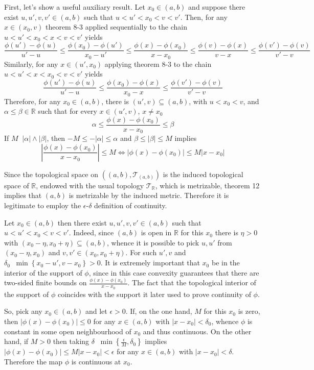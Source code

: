 \documentclass[a4paper]{article}
\newcommand{\obj}[1]{\left\{ #1 \right \}}
\newcommand{\brac}[1]{\left ( #1 \right )}
\newcommand{\abs}[1]{\left | #1 \right |}
\newcommand{\Real}{\mathbb{R}}
\newcommand{\Tcal}{\mathcal{T}}
\newcommand{\defn}{\mathop{\overset{\Delta}{=}}\nolimits}
\begin{document}
First, let's show a useful auxiliary result. Let $x_0\in \brac{a,b}$ and suppose there exist $u, u', v, v' \in \brac{a,b}$ such that $u < u' < x_0 < v < v'$. Then, for any $x\in \brac{x_0, v}$ theorem 8-3 applied sequentially to the chain $u<u'< x_0 < x < v < v'$ yields \[\frac{\phi\brac{u'} - \phi\brac{u}}{u'-u} \leq \frac{\phi\brac{x_0} - \phi\brac{u'}}{x_0-u'} \leq \frac{\phi\brac{x} - \phi\brac{x_0}}{x-x_0} \leq \frac{\phi\brac{v} - \phi\brac{x}}{v-x} \leq \frac{\phi\brac{v'} - \phi\brac{v}}{v'-v}\] Similarly, for any $x\in \brac{u', x_0}$ applying theorem 8-3 to the chain $u<u'<x<x_0<v<v'$ yields \[\frac{\phi\brac{u'} - \phi\brac{u}}{u'-u} \leq \frac{\phi\brac{x_0} - \phi\brac{x}}{x_0-x} \leq \frac{\phi\brac{v'} - \phi\brac{v}}{v'-v}\] Therefore, for any $x_0\in \brac{a, b}$, there is $\brac{u',v}\subseteq \brac{a,b}$, with $u<x_0<v$, and $\alpha\leq \beta \in \Real$ such that for every $x\in \brac{u',v}$, $x\neq x_0$ \[\alpha \leq \frac{\phi\brac{x} - \phi\brac{x_0}}{x-x_0} \leq \beta\] If $M\defn \abs{\alpha}\wedge\abs{\beta}$, then $-M \leq -\abs{\alpha}\leq \alpha$ and $\beta\leq \abs{\beta} \leq M$ implies \[\abs{\frac{\phi\brac{x} - \phi\brac{x_0}}{x-x_0}} \leq M \Leftrightarrow \abs{\phi\brac{x} - \phi\brac{x_0}}\leq M \abs{x-x_0} \]

Since the topological space on $\brac{\brac{a,b}, \Tcal_{\brac{a,b}} }$ is the induced topological space of $\Real$, endowed with the usual topology $\Tcal_\Real$, which is metrizable, theorem 12 implies that $\brac{a,b}$ is metrizable by the induced metric. Therefore it is legitimate to employ the $\epsilon$-$\delta$ definition of continuity.

Let $x_0\in \brac{a,b}$ then there exist $u, u', v, v' \in \brac{a,b}$ such that $u < u' < x_0 < v < v'$. Indeed, since $\brac{a,b}$ is open in $\Real$ for this $x_0$ there is $\eta>0$ with $\brac{ x_0-\eta, x_0+\eta }\subseteq \brac{a, b}$, whence it is possible to pick $u,u'$ from $\brac{x_0-\eta, x_0}$ and $v,v'\in\brac{x_0, x_0+\eta}$. For such $u', v$ and $\delta_0 \defn \min\obj{ x_0 - u', v - x_0} > 0$. It is extremely important that $x_0$ be in the interior of the support of $\phi$, since in this case convexity guarantees that there are two-sided finite bounds on $\frac{\phi\brac{x}-\phi\brac{x_0}}{x-x_0}$. The fact that the topological interior of the support of $\phi$ coincides with the support it later used to prove continuity of $\phi$.

So, pick any $x_0\in \brac{a, b}$ and let $\epsilon>0$. If, on the one hand, $M$ for this $x_0$ is zero, then $\abs{\phi\brac{x}-\phi\brac{x_0}} \leq 0$ for any $x\in\brac{a,b}$ with $\abs{x-x_0}<\delta_0$, whence $\phi$ is constant in some open neighbourhood of $x_0$ and thus continuous. On the other hand, if $M>0$ then taking $\delta\defn \min\obj{ \frac{ \epsilon }{ M }, \delta_0 }$ implies $\abs{\phi\brac{x} - \phi\brac{x_0}} \leq M \abs{x-x_0} < \epsilon$ for any $x\in \brac{a,b}$ with $\abs{x-x_0}<\delta$. Therefore the map $\phi$ is continuous at $x_0$.
\end{document}
